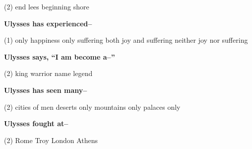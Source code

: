 \documentclass[12pt,a4paper]{exam}
\begin{document}
\begin{questions}
\begin{minipage}{\textwidth}
		\begin{tasks}(2)
			\task end
			\task lees
			\task beginning
			\task shore
		\end{tasks}
	\end{minipage}


	\begin{minipage}{\textwidth}
		\question \textbf{Ulysses has experienced--}

		\begin{tasks}(1)
			\task only happiness
			\task only suffering
			\task both joy and suffering
			\task neither joy nor suffering
		\end{tasks}
	\end{minipage}


	\begin{minipage}{\textwidth}
		\question \textbf{Ulysses says, ``I am become a--''}

		\begin{tasks}(2)
			\task king
			\task warrior
			\task name
			\task legend
		\end{tasks}
	\end{minipage}


	\begin{minipage}{\textwidth}
		\question \textbf{Ulysses has seen many--}

		\begin{tasks}(2)
			\task cities of men
			\task deserts only
			\task mountains only
			\task palaces only
		\end{tasks}
	\end{minipage}


	\begin{minipage}{\textwidth}
		\question \textbf{Ulysses fought at--}

		\begin{tasks}(2)
			\task Rome
			\task Troy
			\task London
			\task Athens
		\end{tasks}
	\end{minipage}


\end{questions}
\end{document}

